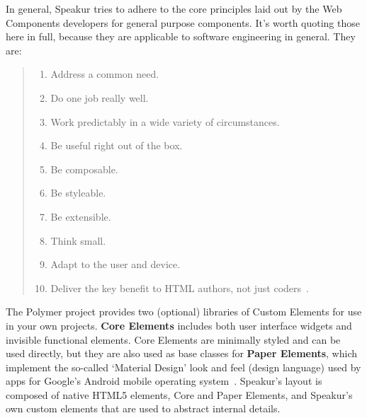 In general, Speakur tries to adhere to the core principles laid out by the 
Web Components developers 
for general purpose components. 
It's worth quoting those here in full, 
because they are applicable to software engineering in general. They are:\label{sec:wcprinciples}
\begin{quote}
\begin{enumerate}
\item Address a common need.\label{wcp:commonneed}
\item Do one job really well.\label{wcp:onejob}
\item Work predictably in a wide variety of circumstances.\label{wcp:predicatable}
\item Be useful right out of the box.\label{wcp:useful}
\item Be composable.\label{wcp:composable}
\item Be styleable.\label{wcp:stylable}
\item Be extensible.\label{wcp:extensible}
\item Think small.\label{wcp:thinksmall}
\item Adapt to the user and device.\label{wcp:adaptable}
\item Deliver the key benefit to HTML authors, not just coders~\label{wcp:htmlauthors}\cite{webcomponentscontributors2014}.
\end{enumerate}
\end{quote}

The Polymer project provides two (optional) libraries of Custom Elements for use in your own projects. 
\textbf{Core Elements} includes both user interface
widgets and invisible functional elements.
Core Elements are minimally styled and can be used directly, 
but they are also used as base classes for 
\textbf{Paper Elements}, 
which implement the so-called `Material Design' look and feel (design language) used by apps for Google's Android mobile operating system~\cite{imura2015}.
Speakur's layout is composed of native HTML5 elements, 
Core and Paper Elements, 
and Speakur's own custom elements that are used to abstract internal details.

